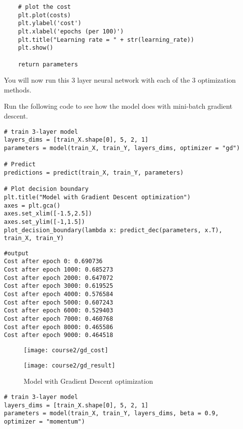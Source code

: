 {\begin{verbatim}
    # plot the cost
    plt.plot(costs)
    plt.ylabel('cost')
    plt.xlabel('epochs (per 100)')
    plt.title("Learning rate = " + str(learning_rate))
    plt.show()

    return parameters
\end{verbatim}


You will now run this 3 layer neural network with each of the 3 optimization methods.

\clearpage
{}

Run the following code to see how the model does with mini-batch gradient descent.
\begin{verbatim}
# train 3-layer model
layers_dims = [train_X.shape[0], 5, 2, 1]
parameters = model(train_X, train_Y, layers_dims, optimizer = "gd")

# Predict
predictions = predict(train_X, train_Y, parameters)

# Plot decision boundary
plt.title("Model with Gradient Descent optimization")
axes = plt.gca()
axes.set_xlim([-1.5,2.5])
axes.set_ylim([-1,1.5])
plot_decision_boundary(lambda x: predict_dec(parameters, x.T), train_X, train_Y)
\end{verbatim}

\begin{verbatim}
#output
Cost after epoch 0: 0.690736
Cost after epoch 1000: 0.685273
Cost after epoch 2000: 0.647072
Cost after epoch 3000: 0.619525
Cost after epoch 4000: 0.576584
Cost after epoch 5000: 0.607243
Cost after epoch 6000: 0.529403
Cost after epoch 7000: 0.460768
Cost after epoch 8000: 0.465586
Cost after epoch 9000: 0.464518
\end{verbatim}

\begin{figure}[h]
\begin{center}
\texttt{[image: course2/gd\_cost]}
\end{center}
\end{figure}

\begin{figure}[h]
\begin{center}
\texttt{[image: course2/gd\_result]}
\caption{Model with Gradient Descent optimization}
\end{center}
\end{figure}


\begin{verbatim}
# train 3-layer model
layers_dims = [train_X.shape[0], 5, 2, 1]
parameters = model(train_X, train_Y, layers_dims, beta = 0.9, optimizer = "momentum")


\end{verbatim}}

